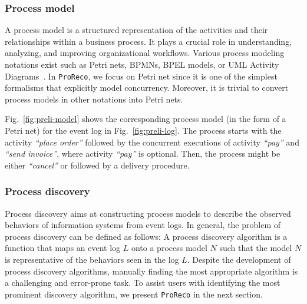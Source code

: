 \subsubsection{Process model}

A process model is a structured representation of the activities and their relationships within a business process. 
It plays a crucial role in understanding, analyzing, and improving organizational workflows. 
Various process modeling notations exist such as Petri nets, BPMNs, BPEL models, or UML Activity Diagrams~\cite{Aalst16PMbook}.  
In \texttt{ProReco}, we focus on Petri net since it is one of the simplest formalisms that explicitly model concurrency. 
Moreover, it is trivial to convert process models in other notations into Petri nets.  

Fig.~\ref{fig:preli-model} shows the corresponding process model (in the form of a Petri net) for the event log in Fig.~\ref{fig:preli-log}. 
The process starts with the activity \textit{``place order''} followed by the concurrent executions of activity \textit{``pay''} and \textit{``send invoice''}, where activity \textit{``pay''} is optional. 
Then, the process might be either \textit{``cancel''} or followed by a delivery procedure. 

\subsubsection{Process discovery}
Process discovery aims at constructing process models to describe the observed behaviors of information systems from event logs. 
In general, the problem of process discovery can be defined as follows: 
A process discovery algorithm is a function that maps an event log $L$ onto a process model $N$ such that the model $N$ is representative of the behaviors seen in the log $L$. 
Despite the development of process discovery algorithms, manually finding the most appropriate algorithm is a challenging and error-prone task. 
To assist users with identifying the most prominent discovery algorithm, we present \texttt{ProReco} in the next section. 


